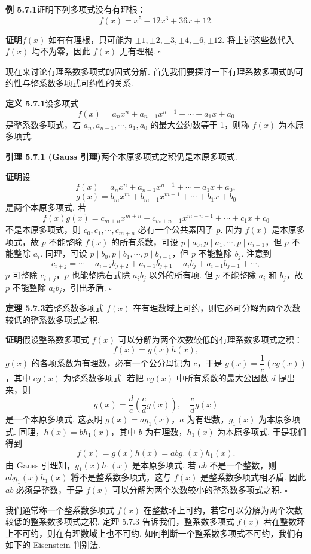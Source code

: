 \documentclass[UTF8, 12pt, fontset=fandol, oneside]{ctexart}
\begin{document}
\noindent\textbf{例 5.7.1}\quad 证明下列多项式没有有理根：
\[
f(x)=x^5-12x^3+36x+12.
\]

\noindent\textbf{证明}\quad $f(x)$ 如有有理根，只可能为 $\pm1,\pm2,\pm3,\pm4,\pm6,\pm12$. 将上述这些数代入 $f(x)$ 均不为零，因此 $f(x)$ 无有理根. $\square$

现在来讨论有理系数多项式的因式分解. 首先我们要探讨一下有理系数多项式的可约性与整系数多项式可约性的关系.

\noindent\textbf{定义 5.7.1}\quad 设多项式
\[
f(x)=a_nx^n+a_{n-1}x^{n-1}+\cdots+a_1x+a_0
\]
是整系数多项式，若 $a_n,a_{n-1},\cdots,a_1,a_0$ 的最大公约数等于 1，则称 $f(x)$ 为本原多项式.

\noindent\textbf{引理 5.7.1 (Gauss 引理)}\quad 两个本原多项式之积仍是本原多项式.

\noindent\textbf{证明}\quad 设
\[
f(x)=a_nx^n+a_{n-1}x^{n-1}+\cdots+a_1x+a_0,
\]
\[
g(x)=b_mx^m+b_{m-1}x^{m-1}+\cdots+b_1x+b_0
\]
是两个本原多项式. 若
\[
f(x)g(x)=c_{m+n}x^{m+n}+c_{m+n-1}x^{m+n-1}+\cdots+c_1x+c_0
\]
不是本原多项式，则 $c_0,c_1,\cdots,c_{m+n}$ 必有一个公共素因子 $p$. 因为 $f(x)$ 是本原多项式，故 $p$ 不能整除 $f(x)$ 的所有系数，可设 $p\mid a_0,p\mid a_1,\cdots,p\mid a_{i-1}$，但 $p$ 不能整除 $a_i$. 同理，可设 $p\mid b_0,p\mid b_1,\cdots,p\mid b_{j-1}$，但 $p$ 不能整除 $b_j$. 注意到
\[
c_{i+j}=\cdots+a_{i-2}b_{j+2}+a_{i-1}b_{j+1}+a_ib_j+a_{i+1}b_{j-1}+\cdots,
\]
$p$ 可整除 $c_{i+j}$，$p$ 也能整除右式除 $a_ib_j$ 以外的所有项. 但 $p$ 不能整除 $a_i$ 和 $b_j$，故 $p$ 不能整除 $a_ib_j$，引出矛盾. $\square$

\noindent\textbf{定理 5.7.3}\quad 若整系数多项式 $f(x)$ 在有理数域上可约，则它必可分解为两个次数较低的整系数多项式之积.

\noindent\textbf{证明}\quad 假设整系数多项式 $f(x)$ 可以分解为两个次数较低的有理系数多项式之积：
\[
f(x)=g(x)h(x),
\]
$g(x)$ 的各项系数为有理数，必有一个公分母记为 $c$，于是 $g(x)=\dfrac1c(cg(x))$，其中 $cg(x)$ 为整系数多项式. 若把 $cg(x)$ 中所有系数的最大公因数 $d$ 提出来，则
\[
g(x)=\frac dc\left(\frac cdg(x)\right),\quad \frac cdg(x)
\]
是一个本原多项式. 这表明 $g(x)=ag_1(x)$，$a$ 为有理数，$g_1(x)$ 为本原多项式. 同理，$h(x)=bh_1(x)$，其中 $b$ 为有理数，$h_1(x)$ 为本原多项式. 于是我们得到
\[
f(x)=g(x)h(x)=abg_1(x)h_1(x).
\]
由 Gauss 引理知，$g_1(x)h_1(x)$ 是本原多项式. 若 $ab$ 不是一个整数，则 $abg_1(x)h_1(x)$ 将不是整系数多项式，这与 $f(x)$ 是整系数多项式相矛盾. 因此 $ab$ 必须是整数，于是 $f(x)$ 可以分解为两个次数较小的整系数多项式之积. $\square$

我们通常称一个整系数多项式 $f(x)$ 在整数环上可约，若它可以分解为两个次数较低的整系数多项式之积. 定理 5.7.3 告诉我们，整系数多项式 $f(x)$ 若在整数环上不可约，则在有理数域上也不可约. 如何判断一个整系数多项式不可约，我们有如下的 Eisenstein 判别法.
\end{document}
